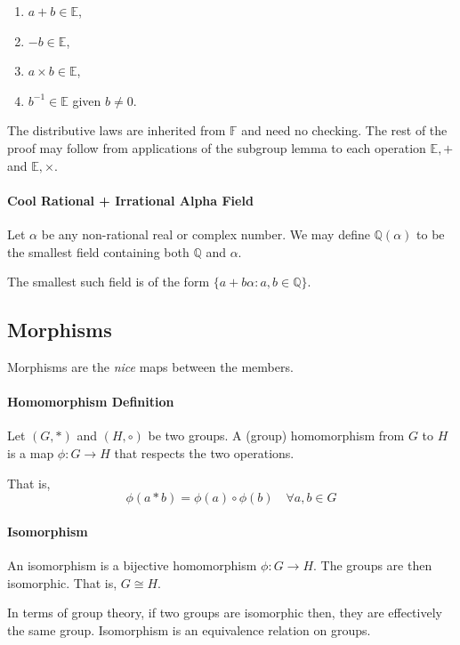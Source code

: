\begin{enumerate}
    \item \(a + b \in \mathbb{E}\),
    \item \(- b \in \mathbb{E}\),
    \item \(a\times b \in \mathbb{E}\),
    \item \(b^{-1} \in \mathbb{E}\) given \(b \neq 0\).
\end{enumerate}

The distributive laws are inherited from \(\mathbb{F}\) and need no checking.
The rest of the proof may follow from applications of the subgroup lemma
to each operation \(\mathbb{E}, +\) and \(\mathbb{E}, \times\).

\paragraph{Cool Rational + Irrational Alpha Field}
Let \(\alpha\) be any non-rational real or complex number.
We may define \( \mathbb{Q}(\alpha)\) to be the smallest field containing both
\(\mathbb{Q}\) and \(\alpha\).

The smallest such field is of the form \(\{
    a + b\alpha : a, b \in \mathbb{Q}
\}\).

\subsection{Morphisms}
Morphisms are the \textit{nice} maps between the members.

\paragraph{Homomorphism Definition}
Let \((G, *)\) and \((H, \circ)\) be two groups.
A (group) homomorphism from \(G\) to \(H\) is a map
\(\phi : G \to H\) that respects the two operations.

That is, \[
    \phi(a*b) = \phi(a) \circ \phi(b) \quad \forall a,b \in G
\]

\paragraph{Isomorphism}
An isomorphism is a bijective homomorphism \(\phi : G\to H\).
The groups are then isomorphic. That is, \(G \cong H\).

In terms of group theory, if two groups are isomorphic then,
they are effectively the same group. Isomorphism is an equivalence
relation on groups.

